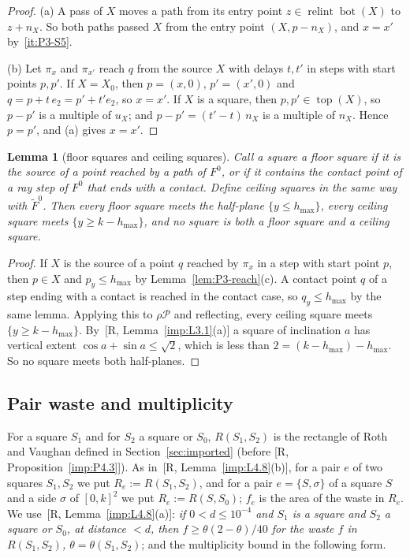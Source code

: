 \documentclass[11pt]{amsart}
\newcommand{\cP}{\mathcal P}
\newcommand{\relint}{\operatorname{relint}}
\newcommand{\Bot}{\operatorname{bot}}
\newcommand{\Top}{\operatorname{top}}
\newcommand{\hmax}{h_{\max}}
\newcommand{\Fz}{F^{0}}
\newtheorem{lemma}[theorem]{Lemma}
\theoremstyle{definition}
\theoremstyle{remark}
\numberwithin{equation}{section}
\begin{document}
\begin{proof}
(a) A pass of $X$ moves a path from its entry point $z\in\relint\Bot(X)$ to $z+n_X$. So both paths passed $X$ from the entry point $(X,p-n_X)$, and $x=x'$ by~\ref{it:P3-S5}.

(b) Let $\pi_x$ and $\pi_{x'}$ reach $q$ from the source $X$ with delays $t,t'$ in steps with start points $p,p'$. If $X=X_0$, then $p=(x,0)$, $p'=(x',0)$ and $q=p+t\,e_2=p'+t'e_2$, so $x=x'$. If $X$ is a square, then $p,p'\in\Top(X)$, so $p-p'$ is a multiple of $u_X$; and $p-p'=(t'-t)\,n_X$ is a multiple of $n_X$. Hence $p=p'$, and (a) gives $x=x'$.
\end{proof}

\begin{lemma}[floor squares and ceiling squares]\label{lem:P3-separation}
Call a square a \emph{floor square} if it is the source of a point reached by a path of $\Fz$, or if it contains the contact point of a ray step of $\Fz$ that ends with a contact. Define \emph{ceiling squares} in the same way with $\tilde F^0$. Then every floor square meets the half-plane $\{y\le\hmax\}$, every ceiling square meets $\{y\ge k-\hmax\}$, and no square is both a floor square and a ceiling square.
\end{lemma}

\begin{proof}
If $X$ is the source of a point $q$ reached by $\pi_x$ in a step with start point $p$, then $p\in X$ and $p_y\le\hmax$ by Lemma~\ref{lem:P3-reach}(c). A contact point $q$ of a step ending with a contact is reached in the contact case, so $q_y\le\hmax$ by the same lemma. Applying this to $\rho\cP$ and reflecting, every ceiling square meets $\{y\ge k-\hmax\}$. By~[R, Lemma~\ref{imp:L3.1}(a)] a square of inclination $a$ has vertical extent $\cos a+\sin a\le\sqrt2$, which is less than $2=(k-\hmax)-\hmax$. So no square meets both half-planes.
\end{proof}

\subsection{Pair waste and multiplicity}\label{ssec:P3-mult}

For a square $S_1$ and for $S_2$ a square or $S_0$, $R(S_1,S_2)$ is the rectangle of Roth and Vaughan defined in Section~\ref{sec:imported} (before [R, Proposition~\ref{imp:P4.3}]). As in~[R, Lemma~\ref{imp:L4.8}(b)], for a pair $e$ of two squares $S_1,S_2$ we put $R_e:=R(S_1,S_2)$, and for a pair $e=\{S,\sigma\}$ of a square $S$ and a side $\sigma$ of $[0,k]^2$ we put $R_e:=R(S,S_0)$; $f_e$ is the area of the waste in $R_e$. We use~[R, Lemma~\ref{imp:L4.8}(a)]: \emph{if $0<d\le10^{-4}$ and $S_1$ is a square and $S_2$ a square or $S_0$, at distance $<d$, then $f\ge\theta(2-\theta)/40$ for the waste $f$ in $R(S_1,S_2)$, $\theta=\theta(S_1,S_2)$}; and the multiplicity bound in the following form.
\end{document}
